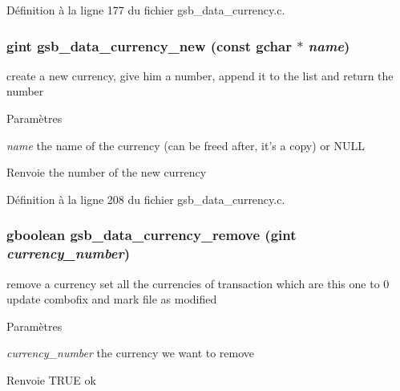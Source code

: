 Définition à la ligne 177 du fichier gsb\_\-data\_\-currency.c.

\subsubsection[{gsb\_\-data\_\-currency\_\-new}]{\setlength{\rightskip}{0pt plus 5cm}gint gsb\_\-data\_\-currency\_\-new (const gchar $\ast$ {\em name})}\label{gsb__data__currency_8c_aa3658e529b7b58f87f6231a87a3e7a75}
create a new currency, give him a number, append it to the list and return the number


\begin{DoxyParams}{Paramètres}
\item[{\em name}]the name of the currency (can be freed after, it's a copy) or NULL\end{DoxyParams}
\begin{DoxyReturn}{Renvoie}
the number of the new currency 
\end{DoxyReturn}


Définition à la ligne 208 du fichier gsb\_\-data\_\-currency.c.

\subsubsection[{gsb\_\-data\_\-currency\_\-remove}]{\setlength{\rightskip}{0pt plus 5cm}gboolean gsb\_\-data\_\-currency\_\-remove (gint {\em currency\_\-number})}\label{gsb__data__currency_8c_ab472787699476a611a2d16a04a980d83}
remove a currency set all the currencies of transaction which are this one to 0 update combofix and mark file as modified


\begin{DoxyParams}{Paramètres}
\item[{\em currency\_\-number}]the currency we want to remove\end{DoxyParams}
\begin{DoxyReturn}{Renvoie}
TRUE ok 
\end{DoxyReturn}


